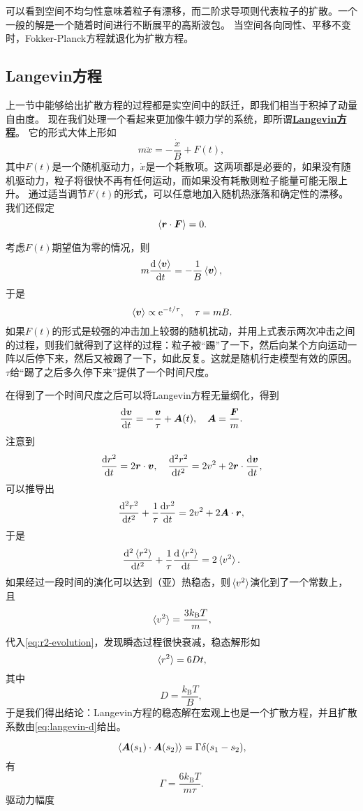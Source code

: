 \documentclass[hyperref, UTF8, a4paper]{ctexart}
\newcommand*{\ee}{\mathrm{e}}
\newcommand{\concept}[1]{\underline{\textbf{#1}}}
\begin{document}
可以看到空间不均匀性意味着粒子有漂移，而二阶求导项则代表粒子的扩散。一个一般的解是一个随着时间进行不断展平的高斯波包。
当空间各向同性、平移不变时，Fokker-Planck方程就退化为扩散方程。

\subsection{Langevin方程}

上一节中能够给出扩散方程的过程都是实空间中的跃迁，即我们相当于积掉了动量自由度。
现在我们处理一个看起来更加像牛顿力学的系统，即所谓\concept{Langevin方程}。
它的形式大体上形如
\begin{equation}
    m \ddot{x} = - \frac{\dot{x}}{B} + F(t),
\end{equation}
其中$F(t)$是一个随机驱动力，$\dot{x}$是一个耗散项。这两项都是必要的，如果没有随机驱动力，粒子将很快不再有任何运动，而如果没有耗散则粒子能量可能无限上升。
通过适当调节$F(t)$的形式，可以任意地加入随机热涨落和确定性的漂移。
我们还假定
\begin{equation}
    \expval*{\vb*{r} \cdot \vb*{F}} = 0.
\end{equation}

考虑$F(t)$期望值为零的情况，则
\[
    m \dv{\expval*{\vb*{v}}}{t} = - \frac{1}{B} \expval*{\vb*{v}},
\]
于是
\begin{equation}
    \expval*{\vb*{v}} \propto \ee^{-t / \tau}, \quad \tau = mB.
\end{equation}
如果$F(t)$的形式是较强的冲击加上较弱的随机扰动，并用上式表示两次冲击之间的过程，则我们就得到了这样的过程：粒子被“踢”了一下，然后向某个方向运动一阵以后停下来，然后又被踢了一下，如此反复。这就是随机行走模型有效的原因。
$\tau$给“踢了之后多久停下来”提供了一个时间尺度。

在得到了一个时间尺度之后可以将Langevin方程无量纲化，得到
\begin{equation}
    \dv{\vb*{v}}{t} = - \frac{\vb*{v}}{\tau} + \vb*{A}(t), \quad \vb*{A} = \frac{\vb*{F}}{m}.
\end{equation}
注意到
\[
    \dv{r^2}{t} = 2 \vb*{r} \cdot \vb*{v}, \quad \dv[2]{r^2}{t} = 2 v^2 + 2 \vb*{r} \cdot \dv{\vb*{v}}{t},
\]
可以推导出
\[
    \dv[2]{r^2}{t} + \frac{1}{\tau} \dv{r^2}{t} = 2 v^2 + 2 \vb*{A} \cdot \vb*{r},
\]
于是
\begin{equation}
    \dv[2]{\expval*{r^2}}{t} + \frac{1}{\tau} \dv{\expval*{r^2}}{t} = 2 \expval*{v^2}.
    \label{eq:r2-evolution}
\end{equation}
如果经过一段时间的演化可以达到（亚）热稳态，则$\expval*{v^2}$演化到了一个常数上，且
\[
    \expval*{v^2} = \frac{3 k_\text{B} T}{m},
\]
代入\eqref{eq:r2-evolution}，发现瞬态过程很快衰减，稳态解形如
\[
    \expval*{r^2} = 6 D t,
\]
其中
\begin{equation}
    D = \frac{k_\text{B} T}{B},
    \label{eq:langevin-d}
\end{equation}
于是我们得出结论：Langevin方程的稳态解在宏观上也是一个扩散方程，并且扩散系数由\eqref{eq:langevin-d}给出。

\begin{equation}
    \expval*{\vb*{A}(s_1) \cdot \vb*{A}(s_2)} = \Gamma \delta(s_1 - s_2),
\end{equation}
有
\begin{equation}
    \Gamma = \frac{6 k_\text{B} T}{m \tau}.
\end{equation}
驱动力幅度
\end{document}
